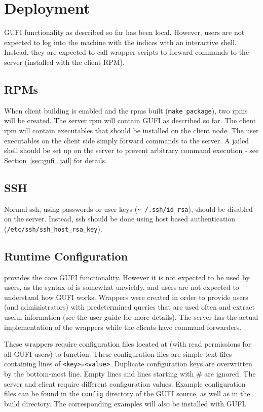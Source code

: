 \section{Deployment}
\label{sec:deploy}
GUFI functionality as described so far has been local. However, users
are not expected to log into the machine with the indices with an
interactive shell. Instead, they are expected to call wrapper scripts
to forward commands to the server (installed with the client RPM).

\subsection{RPMs}
When client building is enabled and the rpms built (\texttt{make
  package}), two rpms will be created. The server rpm will contain
GUFI as described so far. The client rpm will contain executables that
should be installed on the client node. The user executables on the
client side simply forward commands to the server. A jailed shell
should be set up on the server to prevent arbitrary command execution
- see Section~\ref{sec:gufi_jail} for details.

\subsection{SSH}
Normal ssh, using passwords or user keys (\texttt{\textasciitilde
  /.ssh/id\_rsa}), should be disabled on the server. Instead, ssh
should be done using host based authentication
(\texttt{/etc/ssh/ssh\_host\_rsa\_key}).

\subsection{Runtime Configuration}
\gufiquery provides the core GUFI functionality. However it is not
expected to be used by users, as the syntax of \gufiquery is somewhat
unwieldy, and users are not expected to understand how GUFI
works. Wrappers were created in order to provide users (and
administrators) with predetermined queries that are used often and
extract useful information (see the user guide for more details). The
server has the actual implementation of the wrappers while the clients
have command forwarders.

These wrappers require configuration files located at
\guficonfigfile (with read permissions for all GUFI users)
to function. These configuration files are simple text files
containing lines of \texttt{<key>=<value>}. Duplicate configuration
keys are overwritten by the bottom-most line. Empty lines and lines
starting with \# are ignored. The server and client require different
configuration values. Example configuration files can be found in the
\texttt{config} directory of the GUFI source, as well as in the build
directory. The corresponding examples will also be installed with
GUFI.

